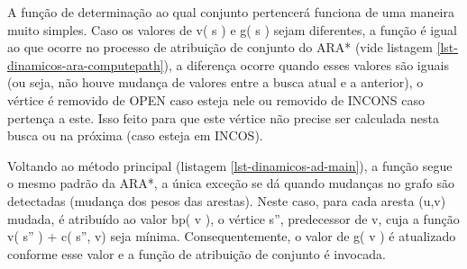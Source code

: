 A função de determinação ao qual conjunto pertencerá funciona de uma maneira muito simples. Caso os valores de v( s ) e g( s ) sejam diferentes, a função é igual ao que ocorre no processo de atribuição de conjunto do ARA* (vide listagem \ref{lst-dinamicos-ara-computepath}), a diferença ocorre quando esses valores são iguais (ou seja, não houve mudança de valores entre a busca atual e a anterior), o vértice é removido de OPEN caso esteja nele ou removido de INCONS caso pertença a este. Isso feito para que este vértice não precise ser calculada nesta busca ou na próxima (caso esteja em INCOS).

Voltando ao método principal (listagem \ref{lst-dinamicos-ad-main}), a função segue o mesmo padrão da ARA*, a única exceção se dá quando mudanças no grafo são detectadas (mudança dos pesos das arestas). Neste caso, para cada aresta (u,v) mudada, é atribuído ao valor bp( v ), o vértice s'', predecessor de v, cuja a função v( s'' ) + c( s'', v) seja mínima. Consequentemente, o valor de g( v ) é atualizado conforme esse valor e a função de atribuição de conjunto é invocada. 